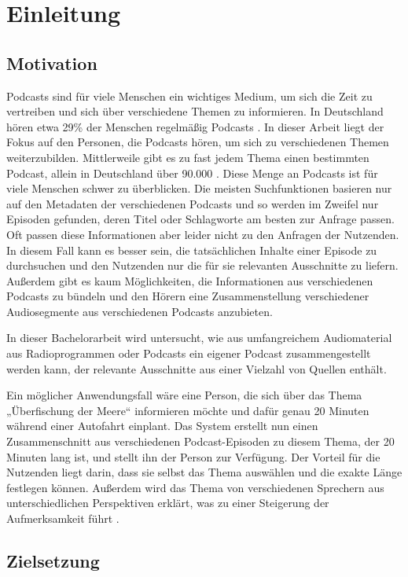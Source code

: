 \chapter{Einleitung}\label{ch:intro}

\section{Motivation}

Podcasts sind für viele Menschen ein wichtiges Medium, um sich die Zeit zu vertreiben und sich über verschiedene Themen zu informieren. 
In Deutschland hören etwa 29\% der Menschen regelmäßig Podcasts \cite{newman2022}.
In dieser Arbeit liegt der Fokus auf den Personen, die Podcasts hören, um sich zu verschiedenen Themen weiterzubilden.
Mittlerweile gibt es zu fast jedem Thema einen bestimmten Podcast, allein in Deutschland über 90.000 \cite{listennotes}.
Diese Menge an Podcasts ist für viele Menschen schwer zu überblicken.
Die meisten Suchfunktionen basieren nur auf den Metadaten der verschiedenen Podcasts und so werden im Zweifel nur Episoden gefunden, deren Titel oder Schlagworte am besten zur Anfrage passen.
Oft passen diese Informationen aber leider nicht zu den Anfragen der Nutzenden.
In diesem Fall kann es besser sein, die tatsächlichen Inhalte einer Episode zu durchsuchen und den Nutzenden nur die für sie relevanten Ausschnitte zu liefern.
Außerdem gibt es kaum Möglichkeiten, die Informationen aus verschiedenen Podcasts zu bündeln und den Hörern eine Zusammenstellung verschiedener Audiosegmente aus verschiedenen Podcasts anzubieten.

In dieser Bachelorarbeit wird untersucht, wie aus umfangreichem Audiomaterial aus Radioprogrammen oder Podcasts ein eigener Podcast zusammengestellt werden kann, der relevante Ausschnitte aus einer Vielzahl von Quellen enthält.

Ein möglicher Anwendungsfall wäre eine Person, die sich über das Thema „Überfischung der Meere“ informieren möchte und dafür genau 20 Minuten während einer Autofahrt einplant. 
Das System erstellt nun einen Zusammenschnitt aus verschiedenen Podcast-Episoden zu diesem Thema, der 20 Minuten lang ist, und stellt ihn der Person zur Verfügung. 
Der Vorteil für die Nutzenden liegt darin, dass sie selbst das Thema auswählen und die exakte Länge festlegen können.
Außerdem wird das Thema von verschiedenen Sprechern aus unterschiedlichen Perspektiven erklärt, was zu einer Steigerung der Aufmerksamkeit führt \cite{kang2012}.

\section{Zielsetzung}

